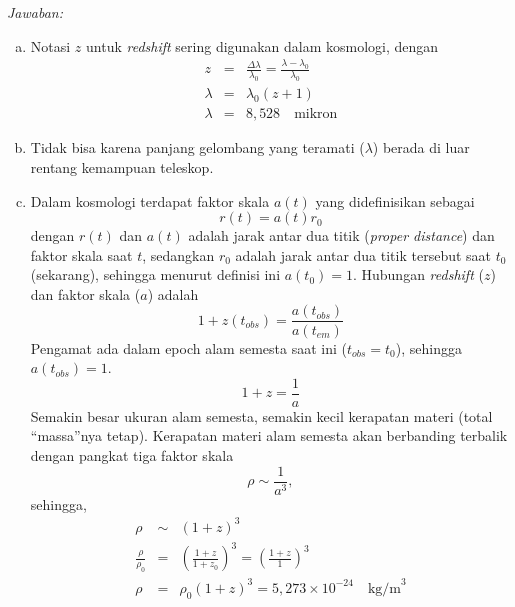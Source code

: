 \documentclass[11pt,fleqn, a4paper]{exam}
\begin{document}
\begin{questions}
\textit{Jawaban:}
\begin{enumerate}[(a)]
\item Notasi $z$ untuk \textit{redshift} sering digunakan dalam kosmologi, dengan
\begin{eqnarray*}
z &=& \frac{\Delta \lambda}{\lambda_{0}} = \frac{\lambda - \lambda_{0}}{\lambda_{0}}\\
\lambda &=& \lambda_{0} (z + 1)\\
 \lambda &=& 8,528 \quad \text{mikron}
\end{eqnarray*}

\item Tidak bisa karena panjang gelombang yang teramati ($\lambda$) berada di luar rentang kemampuan teleskop.

\item Dalam kosmologi terdapat faktor skala $a(t)$ yang didefinisikan sebagai 
\begin{equation*}
r(t) = a(t) r_{0}
\end{equation*}
dengan $r(t)$ dan $a(t)$ adalah jarak antar dua titik (\textit{proper distance}) dan faktor skala saat $t$, sedangkan $r_{0}$ adalah jarak antar dua titik tersebut saat $t_0$ (sekarang), sehingga menurut definisi ini $a(t_0) = 1$.
Hubungan \textit{redshift} ($z$) dan faktor skala ($a$) adalah
\begin{equation*}
1 + z(t_{obs}) = \frac{a(t_{obs})}{a(t_{em})}
\end{equation*}
Pengamat ada dalam epoch alam semesta saat ini ($t_{obs} = t_0$), sehingga $a(t_{obs}) = 1$.
\begin{equation*}
1 + z = \frac{1}{a}
\end{equation*}
Semakin besar ukuran alam semesta, semakin kecil kerapatan materi (total ``massa''nya tetap). Kerapatan materi alam semesta akan berbanding terbalik dengan pangkat tiga faktor skala
\begin{equation*}
\rho \sim \frac{1}{a^3},
\end{equation*}
sehingga,
\begin{eqnarray*}
\rho &\sim& (1 + z)^{3}\\
\frac{\rho}{\rho_0} &=& \left(\frac{1+z}{1+z_0}\right)^{3} = \left(\frac{1+z}{1}\right)^{3}\\
\rho &=& \rho_0 (1+z)^3 = 5,273 \times 10^{-24} \quad \text{kg/m}^3
\end{eqnarray*}
\end{enumerate}



\end{questions}
\end{document}
